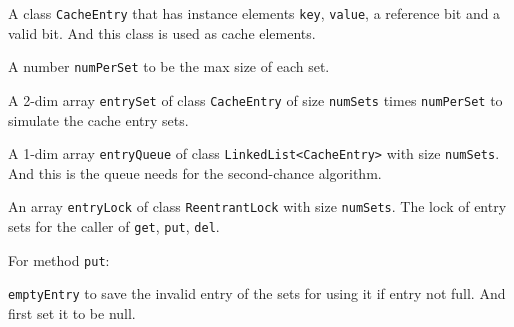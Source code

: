 \documentclass{article}
\begin{document}
A class \texttt{CacheEntry} that has instance elements \texttt{key}, \texttt{value}, a reference bit and a valid bit. And this class is used as cache elements.

A number \texttt{numPerSet} to be the max size of each set.

A 2-dim array \texttt{entrySet} of class \texttt{CacheEntry} of size \texttt{numSets} times \texttt{numPerSet} to simulate the cache entry sets.

A 1-dim array \texttt{entryQueue} of class \texttt{LinkedList<CacheEntry>} with size \texttt{numSets}. And this is the queue needs for the second-chance algorithm.

An array \texttt{entryLock} of class \texttt{ReentrantLock} with size \texttt{numSets}. The lock of entry sets for the caller of \texttt{get}, \texttt{put}, \texttt{del}.

For method \texttt{put}:
\begin{compactitem}
\item \texttt{emptyEntry} to save the invalid entry of the sets for using it if entry not full. And first set it to be null.
\end{compactitem}
\end{document}
